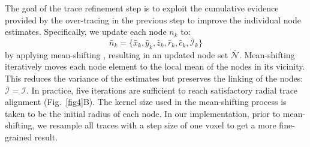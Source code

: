 The goal of the trace refinement step is to exploit the cumulative evidence provided by the over-tracing in the previous step to improve the individual node estimates. Specifically, we update each node $n_k$ to:
\begin{equation}
\label{eq:bar_n_k}
\bar{n}_k = \lbrace \bar{x}_k, \bar{y}_k, \bar{z}_k, \bar{r}_k, \bar{c}_k, \bar{\mathcal{I}}_k \rbrace
\end{equation}
by applying mean-shifting \cite{cheng1995mean}, resulting in an updated node set $\bar{\mathcal{N}}$. Mean-shifting iteratively moves each node element to the local mean of the nodes in its vicinity. This reduces the variance of the estimates but preserves the linking of the nodes: $\bar{\mathcal{I}}=\mathcal{I}$. In practice, five iterations are sufficient to reach satisfactory radial trace alignment (Fig.~\ref{fig4}B). The kernel size used in the mean-shifting process is taken to be the initial radius of each node. In our implementation, prior to mean-shifting, we resample all traces with a step size of one voxel to get a more fine-grained result.

